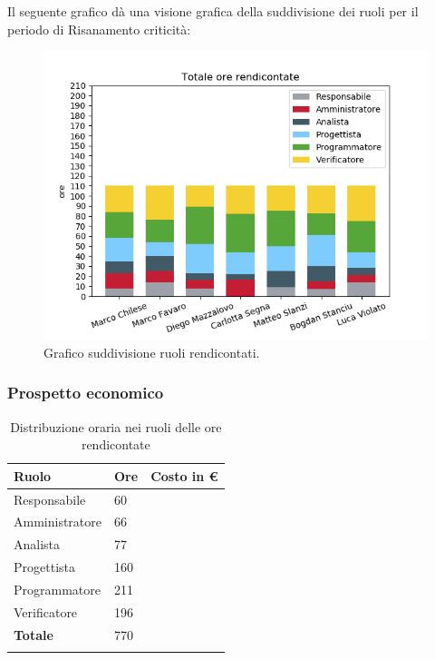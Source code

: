 Il seguente grafico dà una visione grafica della suddivisione dei ruoli per il periodo di Risanamento criticità:%

\begin{figure}[H]
	\centering
  		\includegraphics[width=1\linewidth]{./images/fig_tor.png}
  		\caption{Grafico suddivisione ruoli rendicontati.}
  		\label{fig:grafico suddivione ruoli}
\end{figure}


\subsubsection{Prospetto economico}
\begin{longtable}{| C{.30\textwidth}| C{.15\textwidth}| C{.20\textwidth}|}
\hline
\textbf{Ruolo} & \textbf{Ore} & \textbf{Costo in \euro} \\
\hline
Responsabile & 60 &  \\
\hline
Amministratore & 66 &  \\
\hline
Analista & 77 &  \\
\hline
Progettista & 160 & \\
\hline 
Programmatore & 211 &  \\
\hline
Verificatore & 196 &  \\
\hline 
\textbf{Totale} & 770 & \\
\hline

\caption{Distribuzione oraria nei ruoli delle ore rendicontate}
\label{Distribuzione oraria a carico del committente}
\end{longtable}

